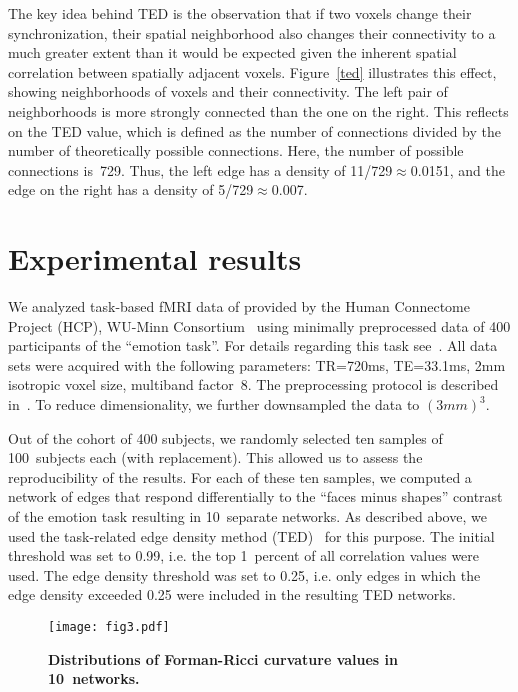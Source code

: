 \documentclass[english,11pt]{article}
\begin{document}
The key idea behind TED is the observation that if two voxels change their synchronization, their
spatial neighborhood also changes their connectivity to a much greater extent than it would be expected
given the inherent spatial correlation between spatially adjacent voxels. Figure~\ref{ted} illustrates this
effect, showing neighborhoods of voxels and their connectivity. The left pair of neighborhoods is
more strongly connected than the one on the right. This reflects on the TED value, which is defined as the
number of connections divided by the number of theoretically possible connections.
Here, the number of possible connections is~729. Thus, the left edge
has a density of 11/729$\approx$0.0151, and the edge on the right has a density of 5/729$\approx$0.007.


\section{Experimental results}


We analyzed task-based fMRI data of provided by the Human Connectome Project (HCP),  WU-Minn Consortium~\cite{HCP,Barch2013}
using minimally preprocessed data of 400 participants of the ``emotion task''.  For details regarding this task see~\cite{Barch2013}.
All data sets were acquired with the following parameters: TR=720ms, TE=33.1ms, 2mm isotropic voxel size, multiband factor~8.
The preprocessing protocol is described in~\cite{HCPpreproc}. To reduce dimensionality, we further downsampled the data to $(3mm)^3$.

Out of the cohort of 400 subjects, we randomly selected ten samples of 100~subjects each (with replacement).
This allowed us to assess the reproducibility of the results.
For each of these ten samples, we computed a network of edges that respond differentially to the ``faces minus shapes'' contrast
of the emotion task resulting in 10~separate networks.
As described above, we used the task-related edge density method (TED)~\cite{lohmann2016} for this purpose.
The initial threshold was set to 0.99, i.e. the top 1~percent of all correlation values were used. The edge density
threshold was set to 0.25, i.e. only edges in which the edge density exceeded 0.25 were included in the resulting
TED networks.



\begin{figure*}[h!]
\centering
\texttt{[image: fig3.pdf]}
\caption{{\bf Distributions of Forman-Ricci curvature values in 10~networks.}}
\label{hist}
\end{figure*}
\end{document}
